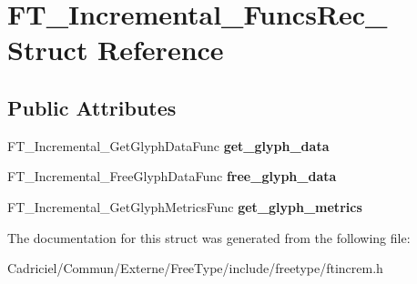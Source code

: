 \hypertarget{struct_f_t___incremental___funcs_rec__}{\section{F\-T\-\_\-\-Incremental\-\_\-\-Funcs\-Rec\-\_\- Struct Reference}
\label{struct_f_t___incremental___funcs_rec__}
}
\subsection*{Public Attributes}
\begin{DoxyCompactItemize}
\item 
\hypertarget{struct_f_t___incremental___funcs_rec___ac276b7ff9624b8d8bf144ab8d00538b4}{F\-T\-\_\-\-Incremental\-\_\-\-Get\-Glyph\-Data\-Func {\bfseries get\-\_\-glyph\-\_\-data}}\label{struct_f_t___incremental___funcs_rec___ac276b7ff9624b8d8bf144ab8d00538b4}

\item 
\hypertarget{struct_f_t___incremental___funcs_rec___a9201afcfda8c15be839aee04306dff0a}{F\-T\-\_\-\-Incremental\-\_\-\-Free\-Glyph\-Data\-Func {\bfseries free\-\_\-glyph\-\_\-data}}\label{struct_f_t___incremental___funcs_rec___a9201afcfda8c15be839aee04306dff0a}

\item 
\hypertarget{struct_f_t___incremental___funcs_rec___ac7d95e85357ab9d1893660b0628c1908}{F\-T\-\_\-\-Incremental\-\_\-\-Get\-Glyph\-Metrics\-Func {\bfseries get\-\_\-glyph\-\_\-metrics}}\label{struct_f_t___incremental___funcs_rec___ac7d95e85357ab9d1893660b0628c1908}

\end{DoxyCompactItemize}


The documentation for this struct was generated from the following file\-:\begin{DoxyCompactItemize}
\item 
Cadriciel/\-Commun/\-Externe/\-Free\-Type/include/freetype/ftincrem.\-h\end{DoxyCompactItemize}

